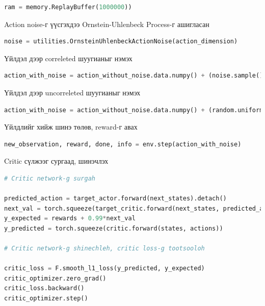 \documentclass[12pt,A4]{report}
\begin{document}
\begin{lstlisting}[language=Python, caption=Replay buffer үүсгэх, frame=single]
ram = memory.ReplayBuffer(1000000))
\end{lstlisting}

Action noise-г үүсгэхдээ Ornstein-Uhlenbeck Process-г ашигласан

\begin{lstlisting}[language=Python, caption=Шуугиан үүсгэх, frame=single]
noise = utilities.OrnsteinUhlenbeckActionNoise(action_dimension)
\end{lstlisting}

Үйлдэл дээр correleted шуугианыг нэмэх

\begin{lstlisting}[language=Python, caption=Үйлдэл дээр шуугиан нэмэх, frame=single]
action_with_noise = action_without_noise.data.numpy() + (noise.sample() * action_max)
\end{lstlisting}

Үйлдэл дээр uncorreleted шуугианыг нэмэх

\begin{lstlisting}[language=Python, caption=Үйлдэл дээр шуугиан нэмэх, frame=single]
action_with_noise = action_without_noise.data.numpy() + (random.uniform(-0.2, 0.2) * action_max)
\end{lstlisting}

Үйлдлийг хийж шинэ төлөв, reward-г авах

\begin{lstlisting}[language=Python, caption=Үйлдэл хийх, frame=single]
new_observation, reward, done, info = env.step(action_with_noise)
\end{lstlisting}

Critic сүлжээг сургаад, шинэчлэх

\begin{lstlisting}[language=Python, caption=Critic сүлжээг сургах шинэчлэх, frame=single]
# Critic network-g surgah

predicted_action = target_actor.forward(next_states).detach()
next_val = torch.squeeze(target_critic.forward(next_states, predicted_action).detach())
y_expected = rewards + 0.99*next_val
y_predicted = torch.squeeze(critic.forward(states, actions))

# Critic network-g shinechleh, critic loss-g tootsooloh
            
critic_loss = F.smooth_l1_loss(y_predicted, y_expected)
critic_optimizer.zero_grad()
critic_loss.backward()
critic_optimizer.step()
\end{lstlisting}	
\end{document}
